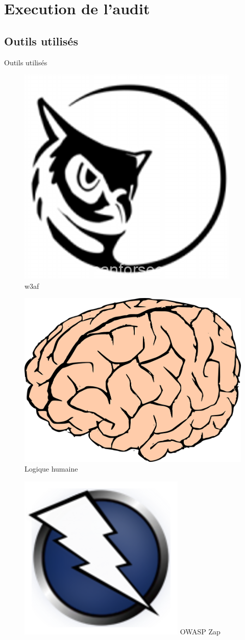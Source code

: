 \documentclass{beamer}
\begin{document}
\section{Execution de l'audit}	
\subsection{Outils utilisés} 
\begin{frame}{Outils utilisés}
	\begin{figure}
		\centering
		\begin{minipage}{.3\textwidth}
			\centering
			\includegraphics[width=.4\linewidth]{schemas/images/w3af.png}
			\break
			w3af
		\end{minipage}%
		\begin{minipage}{.3\textwidth}
			\centering
			\includegraphics[width=.4\linewidth]{schemas/images/brain.png}
			\break 
			Logique humaine
		\end{minipage}
		\begin{minipage}{.3\textwidth}
			\centering
			\includegraphics[width=.4\linewidth]{schemas/images/zap.png}
			\break 
			OWASP Zap
		\end{minipage}
	\end{figure}	
\end{frame}
\end{document}
